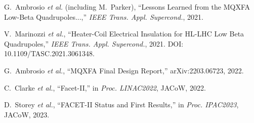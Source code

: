 \vspace{2mm}

\begin{cvitems}
\vspace{2mm}
\item G.~Ambrosio \textit{et al.} (including M.~Parker), ``Lessons Learned from the MQXFA Low-Beta Quadrupoles...,'' \textit{IEEE Trans. Appl. Supercond.}, 2021.
\vspace{2mm}
\item V.~Marinozzi \textit{et al.}, ``Heater-Coil Electrical Insulation for HL-LHC Low Beta Quadrupoles,'' \textit{IEEE Trans. Appl. Supercond.}, 2021. DOI: 10.1109/TASC.2021.3061348.
\vspace{2mm}
\item G.~Ambrosio \textit{et al.}, ``MQXFA Final Design Report,'' arXiv:2203.06723, 2022.
\vspace{2mm}
\item C.~Clarke \textit{et al.}, ``Facet-II,'' in \textit{Proc. LINAC2022}, JACoW, 2022.
\vspace{2mm}
\item D.~Storey \textit{et al.}, ``FACET-II Status and First Results,'' in \textit{Proc. IPAC2023}, JACoW, 2023.

\end{cvitems}














